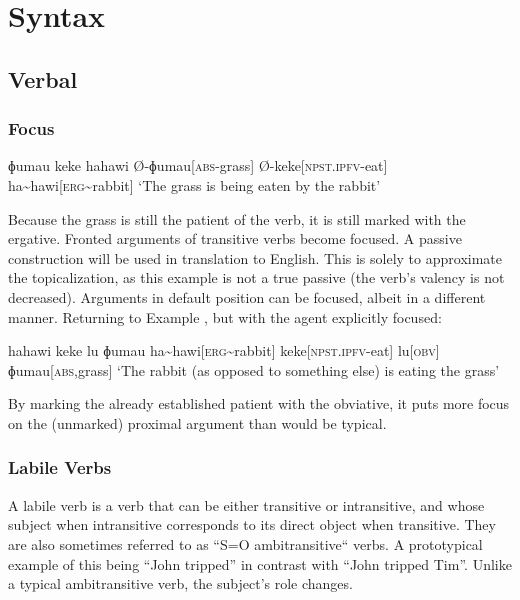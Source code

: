 \part{Syntax}

\chapter{Verbal}

\section{Focus}

\ex
\begingl
\glpreamble ɸumau keke hahawi
\endpreamble
Ø-ɸumau[\textsc{abs-}grass]
Ø-keke[\textsc{npst.ipfv-}eat]
ha\textasciitilde hawi[\textsc{erg\textasciitilde}rabbit]
\glft `The grass is being eaten by the rabbit'
\endgl
\xe

Because the grass is still the patient of the verb, it is still marked with the ergative. Fronted arguments of transitive verbs become focused. A passive construction will be used in translation to English. This is solely to approximate the topicalization, as this example is not a true passive (the verb's valency is not decreased). Arguments in default position can be focused, albeit in a different manner. Returning to Example , but with the agent explicitly focused:

\ex
\begingl
\glpreamble hahawi keke lu ɸumau
\endpreamble
ha\textasciitilde hawi[\textsc{erg\textasciitilde}rabbit]
keke[\textsc{npst.ipfv-}eat]
lu[\textsc{obv}]
ɸumau[\textsc{abs,}grass]
\glft `The rabbit (as opposed to something else) is eating the grass'
\endgl
\xe

By marking the already established patient with the obviative\footnotemark, it puts more focus on the (unmarked) proximal argument than would be typical.


\section{Labile Verbs}

A labile verb is a verb that can be either transitive or intransitive, and whose subject when intransitive corresponds to its direct object when transitive. They are also sometimes referred to as ``S=O ambitransitive`` verbs. A prototypical example of this being ``John tripped'' in contrast with ``John tripped Tim''. Unlike a typical ambitransitive verb, the subject's role changes.

